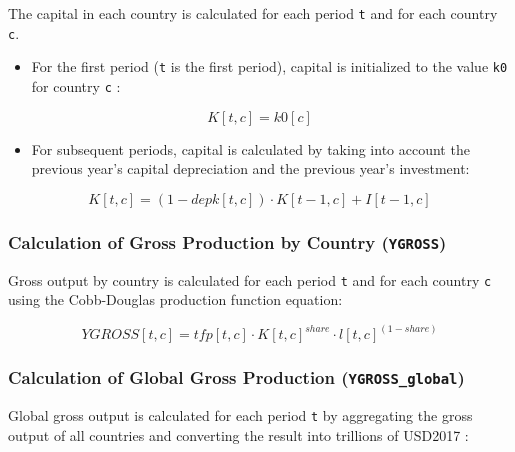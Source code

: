 \documentclass[
]{article}
\providecommand{\tightlist}{%
  \setlength{\itemsep}{0pt}\setlength{\parskip}{0pt}}
\begin{document}
The capital in each country is calculated for each period \texttt{t} and
for each country \texttt{c}.

\begin{itemize}
\tightlist
\item
  For the first period (\texttt{t} is the first period), capital is
  initialized to the value \texttt{k0} for country \texttt{c} :
\end{itemize}

\begin{equation}
 K[t,c] = k0[c]
\end{equation}


\begin{itemize}
\tightlist
\item
  For subsequent periods, capital is calculated by taking into account
  the previous year's capital depreciation and the previous year's
  investment:
\end{itemize}

\begin{equation}
 K[t,c] = (1 - depk[t,c]) \cdot K[t-1,c] + I[t-1,c] 
\end{equation}


\subsubsection{\texorpdfstring{Calculation of Gross Production by Country
(\texttt{YGROSS})}{Calculation of Gross Production by Country (YGROSS)}}\label{calculation-of-gross-production-by-country-ygross}

Gross output by country is calculated for each period \texttt{t} and for
each country \texttt{c} using the Cobb-Douglas production function
equation:

\begin{equation}
 YGROSS[t,c] = tfp[t,c] \cdot K[t,c]^{share} \cdot l[t,c]^{(1-share)} 
\end{equation}


\subsubsection{\texorpdfstring{Calculation of Global Gross Production
(\texttt{YGROSS\_global})}{Calculation of Global Gross Production (YGROSS\_global)}}\label{calculation-of-global-gross-production-ygross_global}

Global gross output is calculated for each period \texttt{t} by
aggregating the gross output of all countries and converting the result
into trillions of USD2017 :
\end{document}
